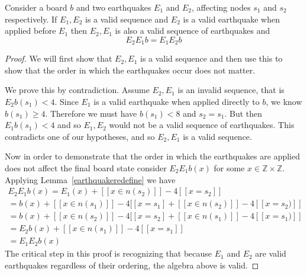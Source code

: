 \documentclass[runningheads,a4paper]{llncs}
\begin{document}
\begin{lemma}
\label{swappinglemma}
Consider a board $b$ and two earthquakes $E_1$ and $E_2$, affecting nodes $s_1$ and $s_2$ respectively. If $E_1, E_2$ is a valid sequence and $E_2$ is a valid earthquake when applied before $E_1$ then $E_2, E_1$ is also a valid sequence of earthquakes and 
\begin{equation*}
E_2 E_1 b = E_1 E_2 b
\end{equation*}
\end{lemma}
\begin{proof}
We will first show that $E_2, E_1$ is a valid sequence and then use this to show that the order in which the earthquakes occur does not matter. 

We prove this by contradiction. Assume $E_2, E_1$ is an invalid sequence, that is $E_2 b(s_1)<4$. Since $E_1$ is a valid earthquake when applied directly to $b$, we know $b(s_1) \geq 4 $. 
Therefore we must have $b(s_1)<8$ and $s_2=s_1$. But then $E_1 b(s_1)<4$ and so $E_1, E_2$ would not be a valid sequence of earthquakes. This contradicts one of our hypotheses, and so $E_2, E_1$ is a valid sequence. 

Now in order to demonstrate that the order in which the earthquakes are applied does not affect the final board state consider $E_2 E_1 b(x)$ for some $x \in \mathbb{Z} \times \mathbb{Z}$. Applying Lemma~\ref{earthquakeredefine} we have 
\begin{align*}
E_2 E_1 b (x) = E_1(x)  + [[ x \in n(s_2) ]] - 4[[ x=s_2]] \\
= b(x) + [[ x \in n(s_1) ]] - 4[[x = s_1] + [[ x \in n(s_2) ]] - 4[[ x= s_2)]]  \\
= b(x) + [[ x \in n(s_2) ]] - 4[[x = s_2] + [[ x \in n(s_1) ]] - 4[[ x= s_1)]]\\
= E_2 b(x) + [[ x \in n(s_1) ]] - 4[[ x = s_1]] \\
= E_1 E_2 b(x) 
\end{align*}
The critical step in this proof is recognizing that because $E_1$ and $E_2$ are valid earthquakes regardless of their ordering, the algebra above is valid.
\end{proof}
\end{document}
